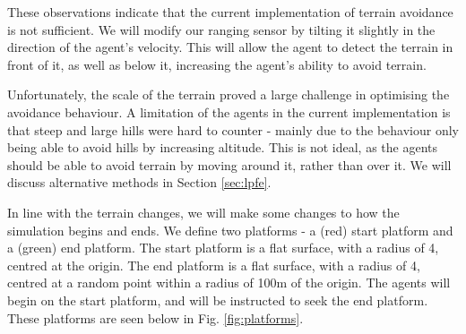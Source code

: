 \documentclass[12pt]{article}
\begin{document}
These observations indicate that the current implementation of terrain avoidance is not sufficient. We will modify our ranging sensor by tilting it slightly in the direction of the agent's velocity. This will allow the agent to detect the terrain in front of it, as well as below it, increasing the agent's ability to avoid terrain.

Unfortunately, the scale of the terrain proved a large challenge in optimising the avoidance behaviour. A limitation of the agents in the current implementation is that steep and large hills were hard to counter - mainly due to the behaviour only being able to avoid hills by increasing altitude. This is not ideal, as the agents should be able to avoid terrain by moving around it, rather than over it. We will discuss alternative methods in Section \ref{sec:lpfe}.

In line with the terrain changes, we will make some changes to how the simulation begins and ends. We define two platforms - a (red) start platform and a (green) end platform. The start platform is a flat surface, with a radius of 4, centred at the origin. The end platform is a flat surface, with a radius of 4, centred at a random point within a radius of 100m of the origin. The agents will begin on the start platform, and will be instructed to seek the end platform. These platforms are seen below in Fig. \ref{fig:platforms}.
\end{document}
